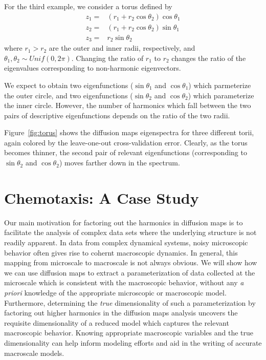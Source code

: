 \documentclass[preprint]{elsarticle}
\begin{document}
For the third example, we consider a torus defined by
%
\begin{equation}
\begin{aligned}
z_1 =& (r_1 + r_2 \cos \theta_2 ) \cos \theta_1 \\
z_2 =& (r_1 + r_2 \cos \theta_2 ) \sin \theta_1 \\
z_3 =& r_2 \sin \theta_2
\end{aligned}
\end{equation}
%
where $r_1 > r_2$ are the outer and inner radii, respectively, and $\theta_1, \theta_2 \sim Unif(0, 2 \pi)$. 
%
Changing the ratio of $r_1$ to $r_2$ changes the ratio of the eigenvalues corresponding to non-harmonic eigenvectors. 

We expect to obtain two eigenfunctions ($\sin \theta_1$ and $\cos \theta_1$) which parmeterize the outer circle, and two eigenfunctions ($\sin \theta_2$ and $\cos \theta_2$) which parameterize the inner circle. 
%
However, the number of harmonics which fall between the two pairs of descriptive eigenfunctions depends on the ratio of the two radii. 

Figure~\ref{fig:torus} shows the diffusion maps eigenspectra for three different torii, again colored by the leave-one-out cross-validation error. 
%
Clearly, as the torus becomes thinner, the second pair of relevant eigenfunctions (corresponding to $\sin \theta_2$ and $\cos \theta_2$) moves farther down in the spectrum. 

\section{Chemotaxis: A Case Study}

Our main motivation for factoring out the harmonics in diffusion maps is to facilitate the analysis of complex data sets where the underlying structure is not readily apparent. 
%
In data from complex dynamical systems, noisy microscopic behavior often gives rise to cohernt macroscopic dynamics. 
%
%
In general, this mapping from microscale to macroscale is not always obvious.
%
We will show how we can use diffusion maps to extract a parameterization of data collected at the microscale which is consistent with the macroscopic behavior, without any {\em a priori} knowledge of the appropriate microscopic or macroscopic model.
%
Furthermore, determining the {\em true} dimensionality of such a parameterization by factoring out higher harmonics in the diffusion maps analysis uncovers the requisite dimensionality of a reduced model which captures the relevant macroscopic behavior. 
%
Knowing appropriate macroscopic variables and the true dimensionality can help inform modeling efforts and aid in the writing of accurate macroscale models.
\end{document}
